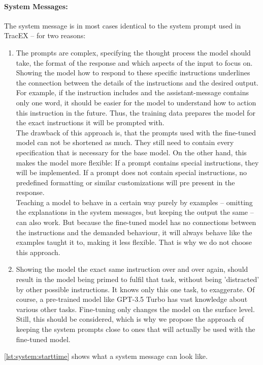 \paragraph{System Messages:} The system message is in most cases identical to the system prompt used in TracEX – for two reasons:
\begin{enumerate}
    \item
        The prompts are complex, specifying the thought process the model should take, the format of the response and which aspects of the input to focus on. Showing the model how to respond to these specific instructions underlines the connection between the details of the instructions and the desired output. For example, if the instruction includes  and the assistant-message contains only one word, it should be easier for the model to understand how to action this instruction in the future. Thus, the training data prepares the model for the exact instructions it will be prompted with.\\
        The drawback of this approach is, that the prompts used with the fine-tuned model can not be shortened as much. They still need to contain every specification that is necessary for the base model. On the other hand, this makes the model more flexible: If a prompt contains special instructions, they will be implemented. If a prompt does not contain special instructions, no predefined formatting or similar customizations will pre present in the response.\\
        Teaching a model to behave in a certain way purely by examples – omitting the explanations in the system messages, but keeping the output the same – can also work. But because the fine-tuned model has no connections between the instructions and the demanded behaviour, it will always behave like the examples taught it to, making it less flexible. That is why we do not choose this approach.
    \item 
        Showing the model the exact same instruction over and over again, should result in the model being primed to fulfil that task, without being 'distracted' by other possible instructions. It knows only this one task, to exaggerate. Of course, a pre-trained model like GPT-3.5 Turbo has vast knowledge about various other tasks. Fine-tuning only changes the model on the surface level. Still, this should be considered, which is why we propose the approach of keeping the system prompts close to ones that will actually be used with the fine-tuned model.
\end{enumerate}
\autoref{lst:system:starttime} shows what a system message can look like.

